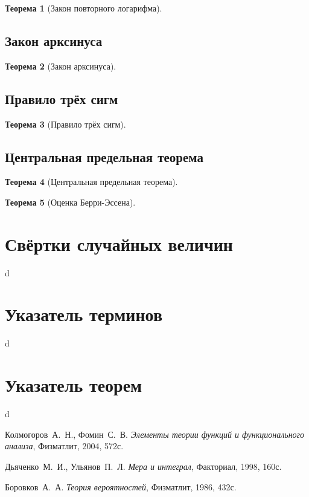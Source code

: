 \documentclass[12pt]{article}
\newtheorem{theorem}{Теорема}
\numberwithin{theorem}{section}
\theoremstyle{definition}
\begin{document}
	\begin{theorem}[Закон повторного логарифма]
		
	\end{theorem}
	
	\subsection{Закон арксинуса}
	
	\begin{theorem}[Закон арксинуса]
		
	\end{theorem}
	
	\subsection{Правило трёх сигм}
	
	\begin{theorem}[Правило трёх сигм]
		
	\end{theorem}
	
	\subsection{Центральная предельная теорема}
	
	\begin{theorem}[Центральная предельная теорема]
		
	\end{theorem}
	
	\begin{theorem}[Оценка Берри-Эссена]
		
	\end{theorem}
	
	\section{Свёртки случайных величин}
	
	d
	
	\section{Указатель терминов}
	
	d
	
	\section{Указатель теорем}
	
	d
	
	\begin{thebibliography}{2}
		
		 Колмогоров~А.~Н., Фомин~С.~В. {\it Элементы теории функций и функционального анализа}, Физматлит, 2004, 572с.
		
		 Дьяченко~М.~И., Ульянов~П.~Л. {\it Мера и интеграл}, Факториал, 1998, 160с.
	
		 Боровков~А.~А. {\it Теория вероятностей}, Физматлит, 1986, 432с.
	
	\end{thebibliography}
	
	
\end{document}
